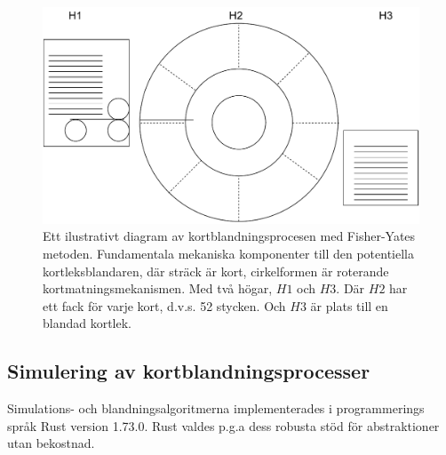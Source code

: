 \documentclass[swedish,a4paper]{article}
\begin{document}
\begin{figure}[H]
	\centering
	\includegraphics[width=0.6\linewidth]{irl_wheel_shuffle.pdf}
	\captionsetup{width=0.6\textwidth} \caption{Ett ilustrativt diagram av
		kortblandningsprocesen med 
	Fisher-Yates metoden. Fundamentala mekaniska komponenter till den potentiella
	kortleksblandaren, där sträck är kort, cirkelformen är roterande
kortmatningsmekanismen. Med två högar, $H1$ och $H3$. Där $H2$ har ett fack för
varje kort, d.v.s. 52 stycken. Och $H3$ är plats till en blandad kortlek.}
	\label{fig:irl_wheel}
\end{figure}


\subsection{Simulering av kortblandningsprocesser}
\label{sec:sim_kort}
Simulations- och blandningsalgoritmerna implementerades i programmerings språk
Rust version 1.73.0. Rust valdes p.g.a dess robusta stöd för abstraktioner utan bekostnad.  

% 


\end{document}
